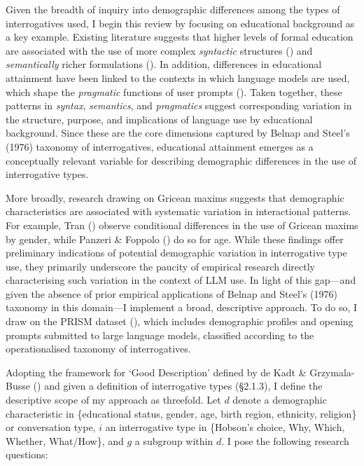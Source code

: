 \documentclass[
  12pt,
]{article}
\begin{document}
Given the breadth of inquiry into demographic differences among the types of interrogatives used, I begin this review by focusing on educational background as a key example. Existing literature suggests that higher levels of formal education are associated with the use of more complex \emph{syntactic} structures () and \emph{semantically} richer formulations (). In addition, differences in educational attainment have been linked to the contexts in which language models are used, which shape the \emph{pragmatic} functions of user prompts (). Taken together, these patterns in \emph{syntax}, \emph{semantics}, and \emph{pragmatics} suggest corresponding variation in the structure, purpose, and implications of language use by educational background. Since these are the core dimensions captured by Belnap and Steel's (1976) taxonomy of interrogatives, educational attainment emerges as a conceptually relevant variable for describing demographic differences in the use of interrogative types.

More broadly, research drawing on Gricean maxims suggests that demographic characteristics are associated with systematic variation in interactional patterns. For example, Tran () observe conditional differences in the use of Gricean maxims by gender, while Panzeri \& Foppolo () do so for age. While these findings offer preliminary indications of potential demographic variation in interrogative type use, they primarily underscore the paucity of empirical research directly characterising such variation in the context of LLM use. In light of this gap---and given the absence of prior empirical applications of Belnap and Steel's (1976) taxonomy in this domain---I implement a broad, descriptive approach. To do so, I draw on the PRISM dataset (), which includes demographic profiles and opening prompts submitted to large language models, classified according to the operationalised taxonomy of interrogatives.

Adopting the framework for `Good Description' defined by de Kadt \& Grzymala-Busse () and given a definition of interrogative types (§2.1.3), I define the descriptive scope of my approach as threefold. Let \(d\) denote a demographic characteristic in \{educational status, gender, age, birth region, ethnicity, religion\} or conversation type, \(i\) an interrogative type in \{Hobson's choice, Why, Which, Whether, What/How\}, and \(g\) a subgroup within \(d\). I pose the following research questions:
\end{document}
